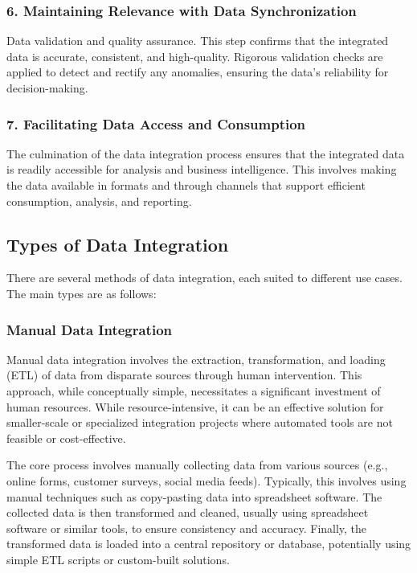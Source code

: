 \documentclass[12pt]{book}
\begin{document}
\subsubsection{6. Maintaining Relevance with Data Synchronization}
Data validation and quality assurance. This step confirms that the integrated data is accurate, consistent, and high-quality. Rigorous validation checks are applied to detect and rectify any anomalies, ensuring the data's reliability for decision-making.
\subsubsection{7. Facilitating Data Access and Consumption}
The culmination of the data integration process ensures that the integrated data is readily accessible for analysis and business intelligence. This involves making the data available in formats and through channels that support efficient consumption, analysis, and reporting.

\subsection{Types of Data Integration}
There are several methods of data integration, each suited to different use cases. The main types are as follows:

\subsubsection{Manual Data Integration}

Manual data integration involves the extraction, transformation, and loading (ETL) of data from disparate 
sources through human intervention. This approach, while conceptually simple, necessitates a significant 
investment of human resources.  While resource-intensive, it can be an effective solution for smaller-scale 
or specialized integration projects where automated tools are not feasible or cost-effective.

The core process involves manually collecting data from various sources (e.g., online forms, customer surveys, 
social media feeds). Typically, this involves using manual techniques such as copy-pasting data into spreadsheet 
software. The collected data is then transformed and cleaned, usually using spreadsheet software or similar 
tools, to ensure consistency and accuracy. Finally, the transformed data is loaded into a central repository 
or database, potentially using simple ETL scripts or custom-built solutions.
\end{document}

